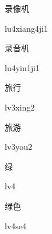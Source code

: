 \begin{multicols*}{2}
\begin{verbete}[lu4xiang4ji1]{录像机}
\begin{pronuncia}{lu4xiang4ji1}
\end{pronuncia}
\end{verbete}

\begin{verbete}[lu4yin1ji1]{录音机}
\begin{pronuncia}{lu4yin1ji1}
\end{pronuncia}
\end{verbete}

\begin{verbete}[lv3xing2]{旅行}
\begin{pronuncia}{lv3xing2}
\end{pronuncia}
\end{verbete}

\begin{verbete}[lv3you2]{旅游}
\begin{pronuncia}{lv3you2}
\end{pronuncia}
\end{verbete}

\begin{verbete}[lv4]{绿}
\begin{pronuncia}{lv4}
\end{pronuncia}
\end{verbete}

\begin{verbete}[lv4se4]{绿色}
\begin{pronuncia}{lv4se4}
\end{pronuncia}
\end{verbete}

\end{multicols*}
